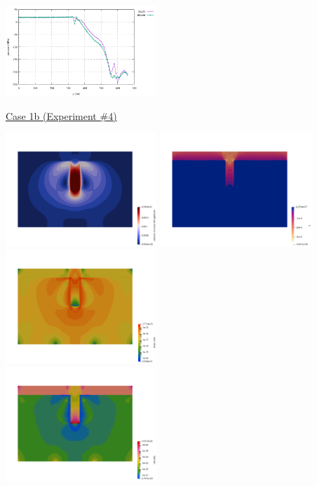 \begin{center}
\includegraphics[width=5.7cm]{python_codes/fieldstone_87/results/experiment_03/vertical_profile_p.pdf}\\
\end{center}


\newpage
\underline{Case 1b (Experiment \#4)}

\begin{center}
\includegraphics[width=5.7cm]{python_codes/fieldstone_87/results/experiment_04/100x66_N/vel.png}
\includegraphics[width=5.7cm]{python_codes/fieldstone_87/results/experiment_04/100x66_N/p.png}
\includegraphics[width=5.7cm]{python_codes/fieldstone_87/results/experiment_04/100x66_N/sr.png}\\
\includegraphics[width=5.7cm]{python_codes/fieldstone_87/results/experiment_04/100x66_N/eta.png}

\end{center}
